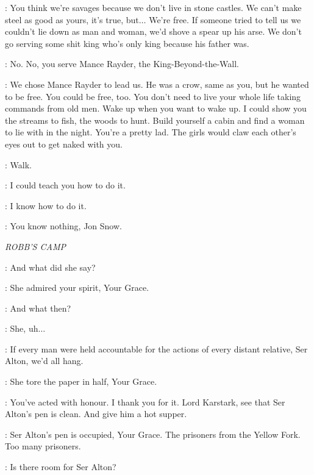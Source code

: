 
\YGRITTE: You think we're savages because we don't live in stone castles. We can't make steel as good as yours, it's true, but$\ldots$ We're free. If someone tried to tell us we couldn't lie down as man and woman, we'd shove a spear up his arse. We don't go serving some shit king who's only king because his father was.

\JON: No. No, you serve Mance Rayder, the King-Beyond-the-Wall.


\YGRITTE: We chose Mance Rayder to lead us. He was a crow, same as you, but he wanted to be free. You could be free, too. You don't need to live your whole life taking commands from old men. Wake up when you want to wake up. I could show you the streams to fish, the woods to hunt. Build yourself a cabin and find a woman to lie with in the night. You're a pretty lad. The girls would claw each other's eyes out to get naked with you.

\JON: Walk.

\YGRITTE: I could teach you how to do it.

\JON: I know how to do it.

\YGRITTE: You know nothing, Jon Snow.



\scene

\textit{ROBB'S CAMP}


\ROBB: And what did she say?

\ALTON: She admired your spirit, Your Grace.

\ROBB: And what then?

\ALTON: She, uh$\ldots$

\ROBB: If every man were held accountable for the actions of every distant relative, Ser Alton, we'd all hang.

\ALTON: She tore the paper in half, Your Grace.

\ROBB: You've acted with honour. I thank you for it. Lord Karstark, see that Ser Alton's pen is clean. And give him a hot supper.

\KARSTARK: Ser Alton's pen is occupied, Your Grace. The prisoners from the Yellow Fork. Too many prisoners.

\ROBB: Is there room for Ser Alton?

